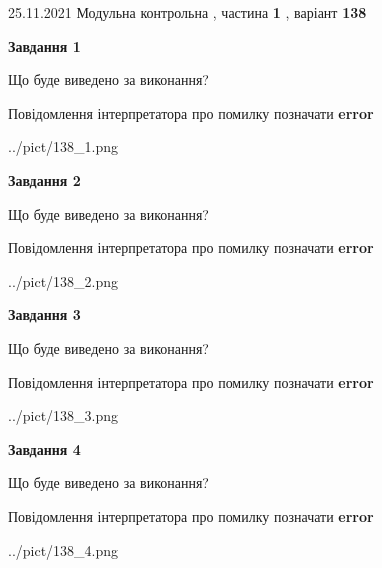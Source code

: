 \documentclass[10pt, ukrainian]{article}
\begin{document}
{25.11.2021 Модульна контрольна , частина \textbf { 1 }, варіант  \No \textbf { 138 }\par}
{
\begin {large}

{\begin {center}\textbf{Завдання 1}\end {center}}\par
Що буде виведено за виконання? \par
Повідомлення інтерпретатора про помилку позначати \textbf{error}

\begin{center}
	{../pict/138_1.png}
\end{center}
\newpage

{\begin {center}\textbf{Завдання 2}\end {center}}\par
Що буде виведено за виконання? \par
Повідомлення інтерпретатора про помилку позначати \textbf{error}

\begin{center}
	{../pict/138_2.png}
\end{center}
\newpage

{\begin {center}\textbf{Завдання 3}\end {center}}\par
Що буде виведено за виконання? \par
Повідомлення інтерпретатора про помилку позначати \textbf{error}

\begin{center}
	{../pict/138_3.png}
\end{center}
\newpage

{\begin {center}\textbf{Завдання 4}\end {center}}\par
Що буде виведено за виконання? \par
Повідомлення інтерпретатора про помилку позначати \textbf{error}

\begin{center}
	{../pict/138_4.png}
\end{center}
\newpage


\end{large}}
\end{document}
